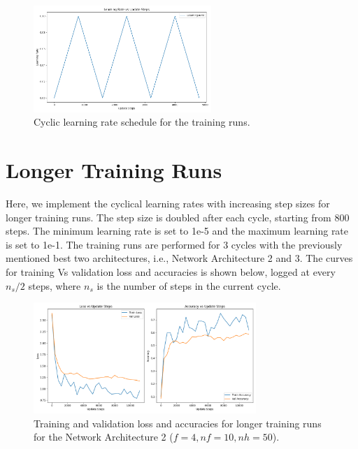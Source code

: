 \documentclass[11pt]{article}
\begin{document}
\begin{figure}[H]
    \centering
    \includegraphics[width=0.6\textwidth]{results/architecture_basic_2_learning_rate_plot.png}
    \caption{Cyclic learning rate schedule for the training runs.}
    \label{fig:cyclic_learning_rate}
\end{figure}

\section*{Longer Training Runs}

Here, we implement the cyclical learning rates with increasing step sizes for longer training runs. The step size is doubled after each cycle, starting from 800 steps. The minimum learning rate is set to 1e-5 and the maximum learning rate is set to 1e-1. The training runs are performed for 3 cycles with the previously mentioned best two architectures, i.e., Network Architecture 2 and 3.
The curves for training Vs validation loss and accuracies is shown below, logged at every $n_s/2$ steps, where $n_s$ is the number of steps in the current cycle.

\begin{figure}[H]
  \centering
  \includegraphics[width=0.75\textwidth]{results/architecture_2_training_plot.png}
  \caption{Training and validation loss and accuracies for longer training runs for the Network Architecture 2 ($f=4, nf=10, nh=50$).}
  \label{fig:longer_training_runs_arch2}
\end{figure}
\end{document}
